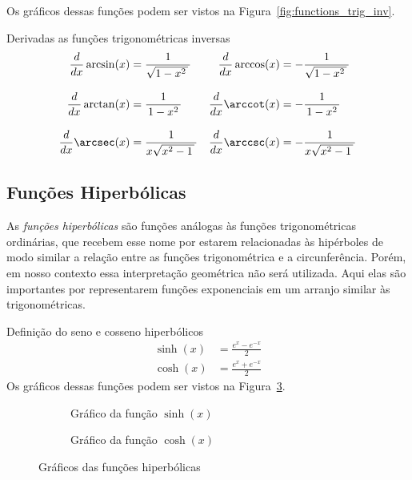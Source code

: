 Os gráficos dessas funções podem ser vistos na Figura~\ref{fig:functions_trig_inv}.

Derivadas as funções trigonométricas inversas
\begin{align*}
  \frac{d}{dx} \arcsin(x) & =  \frac{1}{\sqrt{1-x^2\,}\,}  &
  \frac{d}{dx} \arccos(x) & = -\frac{1}{\sqrt{1-x^2\,}\,}  \\[3mm]
  \frac{d}{dx} \arctan(x) & =  \frac{1}{\,1-x^2\,}         &
  \frac{d}{dx} \arccot(x) & = -\frac{1}{\,1-x^2\,}         \\[3mm]
  \frac{d}{dx} \arcsec(x) & =  \frac{1}{x\sqrt{x^2-1\,}\,} &
  \frac{d}{dx} \arccsc(x) & = -\frac{1}{x\sqrt{x^2-1\,}\,}
\end{align*}

\FloatBarrier

\subsection*{Funções Hiperbólicas}

As \emph{funções hiperbólicas}
são funções análogas às funções trigonométricas ordinárias,
que recebem esse nome por estarem relacionadas às hipérboles de modo similar
a relação entre as funções trigonométrica e a circunferência. Porém, em nosso
contexto essa interpretação geométrica não será utilizada. Aqui elas são importantes
por representarem funções exponenciais em um arranjo similar às trigonométricas.

Definição do seno e cosseno hiperbólicos%
\begin{align}
\sinh(x) & = \frac{e^x - e^{-x}}{2} \label{eq:def_seno_hiperbolico}    \\[3mm]
\cosh(x) & = \frac{e^x + e^{-x}}{2} \label{eq:def_cosseno_hiperbolico}
\end{align}
Os gráficos dessas funções podem ser vistos na Figura~\ref{fig:functions_hyper}.

\begin{figure}
  \centering
  \begin{subfigure}[b]{0.5\linewidth}
    \centering
    
    \caption{Gráfico da função $\sinh(x)$}
    \label{fig:functions_sinh}
  \end{subfigure}%
  \begin{subfigure}[b]{0.5\linewidth}
    \centering
    
    \caption{Gráfico da função $\cosh(x)$}
    \label{fig:functions_cosh}
  \end{subfigure}
  \caption{Gráficos das funções hiperbólicas}
  \label{fig:functions_hyper}
\end{figure}

